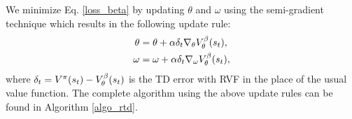 We minimize Eq. \ref{loss_beta} by updating $\theta$ and $\omega$ using the semi-gradient technique which results in the following update rule:
\begin{equation}
\begin{split}
	\theta &= \theta + \alpha \delta_t  \nabla_{\theta} V^{\beta}_{\theta} (s_t), \\
	\omega &= \omega + \alpha \delta_t  \nabla_{\omega} V^{\beta}_{\theta} (s_t),
\end{split}
\end{equation}
where $\delta_t = V^{\pi}(s_t) - V^{\beta}_{\theta}(s_t)$ is the TD error with RVF in the place of the usual value function. The complete algorithm using the above update rules can be found in Algorithm \ref{algo_rtd}.

